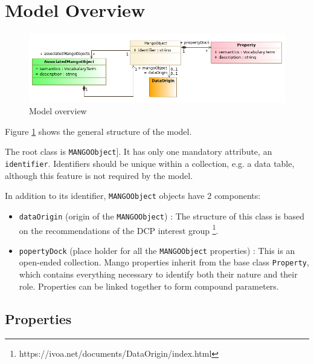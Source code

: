 \documentclass[11pt,a4paper]{ivoa}
\begin{document}
\section{Model Overview}

\begin{figure}
     \includegraphics[width=1.0\textwidth]{../model/overview.png}
     \caption{Model overview}
     \label{fig:overview}
\end{figure}

Figure \ref{fig:overview} shows the general structure of the model.

The root class is \texttt{MANGOObject}]. 
It has only one mandatory attribute, an \texttt{identifier}.
Identifiers should be unique within a collection, e.g. a data table, although 
this feature is not required by the model.

In addition to its identifier, \texttt{MANGOObject} objects have 2 components:

\begin{itemize}[noitemsep,topsep=0pt,parsep=0pt,partopsep=0pt]

  \item \texttt{dataOrigin} (origin of the \texttt{MANGOObject}) : The structure of this class is based on
        the recommendations of the DCP interest group \footnote{https://ivoa.net/documents/DataOrigin/index.html}.
  \item \texttt{popertyDock} (place holder for all the \texttt{MANGOObject} properties) :
        This is an open-ended collection.
        Mango properties inherit from the base class \texttt{Property},
        which contains everything necessary to identify both their nature and their role.
        Properties can be linked together to form compound parameters.
\end{itemize}


\subsection{Properties}
\end{document}
